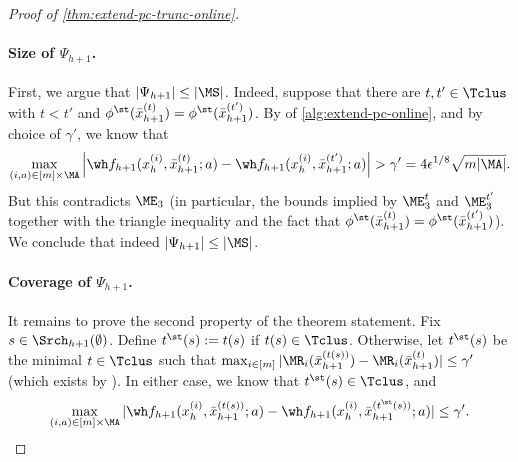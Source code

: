 \begin{proof}[Proof of \cref{thm:extend-pc-trunc-online}]
\paragraph{Size of $\Psi_{h+1}$.} First, we argue that $|\Psi_{h+1}| \leq |\MS|$. Indeed, suppose that there are $t,t' \in \Tclus$ with $t<t'$ and $\phi^\st(\bar x_{h+1}^{(t)}) = \phi^\st(\bar x_{h+1}^{(t')})$. By  of \cref{alg:extend-pc-online}, and by choice of $\gamma'$, we know that 
\[\max_{(i,a) \in [m]\times\MA} \left|\wh f_{h+1}(x_h^{(i)},\bar x_{h+1}^{(t)};a) - \wh f_{h+1}(x_h^{(i)},\bar x_{h+1}^{(t')};a)\right| > \gamma' = 4\epsilon^{1/8}\sqrt{m|\MA|}.\] But this contradicts $\ME_3$ (in particular, the bounds implied by $\ME_3^t$ and $\ME_3^{t'}$ together with the triangle inequality and the fact that $\phi^\st(\bar x_{h+1}^{(t)}) = \phi^\st(\bar x_{h+1}^{(t')})$). We conclude that indeed $|\Psi_{h+1}| \leq |\MS|$.

\paragraph{Coverage of $\Psi_{h+1}$.} It remains to prove the second property of the theorem statement. Fix $s \in \Srch_{h+1}(\emptyset)$. Define $t^\st(s) := t(s)$ if $t(s) \in \Tclus$. Otherwise, let $t^\st(s)$ be the minimal $t \in \Tclus$ such that $\max_{i \in [m]} |\MR_i(\bar x_{h+1}^{(t(s))})-\MR_i(\bar x_{h+1}^{(t)})| \leq \gamma'$ (which exists by ). In either case, we know that $t^\st(s) \in \Tclus$, and \begin{equation}
\max_{(i,a) \in [m]\times\MA} |\wh f_{h+1}(x_h^{(i)},\bar x_{h+1}^{(t(s))};a)-\wh f_{h+1}(x_h^{(i)},\bar x_{h+1}^{(t^\st(s))};a)| \leq \gamma'.
\label{eq:t-tst-close}
\end{equation}


\end{proof}
